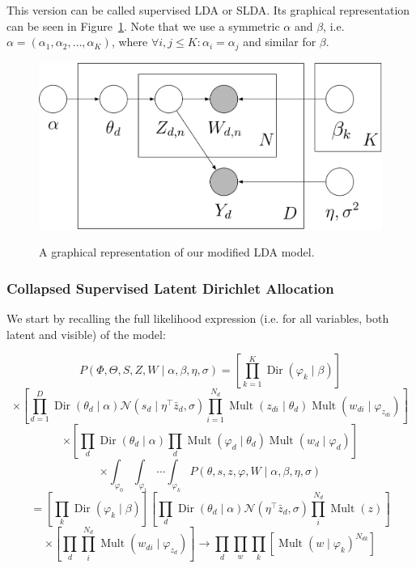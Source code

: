 \documentclass[a4paper,10pt]{article}
\DeclareMathOperator{\Dir}{Dir}
\DeclareMathOperator{\Mult}{Mult}
\renewcommand{\phi}{\varphi}
\begin{document}
This version can be called supervised LDA or SLDA.
Its graphical representation can be seen in Figure~\ref{fig:SLDA}.
Note that we use a symmetric $\alpha$ and $\beta$, i.e. $\alpha=(\alpha_1, \alpha_2, \dots, \alpha_K)$, where $\forall i,j \leq K: \alpha_i = \alpha_j$ and similar for $\beta$.

\begin{figure}[ht!]
  \centering
  \includegraphics[width=\textwidth]{SLDA.png}
  \label{fig:SLDA}
  \caption{A graphical representation of our modified LDA model.}
\end{figure}

\subsubsection{Collapsed Supervised Latent Dirichlet Allocation}

We start by recalling the full likelihood expression (i.e. for all variables, both latent and visible) of the model:

\[P(\Phi, \Theta, S, Z, W \mid \alpha, \beta, \eta, \sigma) = \left[ \prod_{k = 1}^K \Dir(\phi_k \mid \beta) \right]  \]
\begin{equation}
\label{eq:prodpart}
\times \left[ \prod_{d = 1}^D \Dir(\theta_d \mid \alpha) \mathcal{N}(s_d \mid \eta^\top \bar{z}_d, \sigma) \prod_{i = 1}^{N_d} \Mult(z_{di} \mid \theta_d) \Mult(w_{di} \mid \varphi_{z_{di}}) \right]
\end{equation}
\[\times \left[ \prod_{d} \Dir(\theta_d \mid \alpha) \prod_d \Mult(\phi_d \mid \theta_d )\Mult(w_d \mid \phi_d)\right]\]
\[\times \int_{\phi_0}\int_{\phi_1}\cdots \int_{\phi_k} P(\theta, s, z, \phi, W \mid \alpha, \beta, \eta, \sigma)\]
\[=\left[ \prod_k \Dir(\phi_k \mid \beta) \right] \left[ \prod_d \Dir(\theta_d \mid \alpha) \mathcal{N}(\eta^\top \bar{z}_d, \sigma) \prod_i^{N_d} \Mult(z) \right]\]
\[\times \left[  \prod_d \prod_i^{N_d} \Mult(w_{di} \mid \phi_{z_d})\right] \rightarrow \prod_d \prod_w \prod_k \left[ \Mult(w \mid \phi_k)^{N_{dk}}\right]\]
\end{document}
